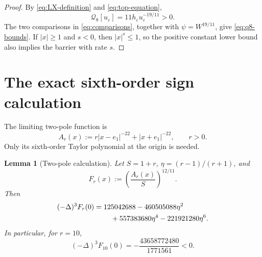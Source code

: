 \documentclass[11pt,reqno]{amsart}
\newtheorem{lemma}[theorem]{Lemma}
\theoremstyle{remark}
\newcommand{\Qlx}{\mathcal{Q}}
\newcommand{\eps}{\varepsilon}
\begin{document}
\begin{proof}
By \eqref{eq:LX-definition} and \eqref{eq:top-equation},
\begin{equation}\label{eq:q8-explicit}
 \Qlx_8[u_\eps]
 =11h_\eps u_\eps^{-19/11}>0.
\end{equation}
The two comparisons in \eqref{eq:comparisons}, together with
\(\psi=W^{19/11}\), give \eqref{eq:q8-bounds}.  If \(|x|\geq1\) and
\(s<0\), then \(|x|^s\leq1\), so the positive constant lower bound also
implies the barrier with rate \(s\).
\end{proof}

\section{The exact sixth-order sign calculation}

The limiting two-pole function is
\begin{equation}\label{eq:A-r}
 A_r(x):=r|x-e_1|^{-22}+|x+e_1|^{-22},
 \qquad r>0.
\end{equation}
Only its sixth-order Taylor polynomial at the origin is needed.

\begin{lemma}[Two-pole calculation]\label{lem:two-pole}
Let \(S=1+r\), \(\eta=(r-1)/(r+1)\), and
\begin{equation}\label{eq:F-r}
 F_r(x):=\left(\frac{A_r(x)}{S}\right)^{12/11}.
\end{equation}
Then
\begin{align}
 (-\Delta)^3F_r(0)
 ={}&125042688-460505088\eta^2
 \notag\\
 &\quad+557383680\eta^4-221921280\eta^6.
 \label{eq:eta-polynomial}
\end{align}
In particular, for \(r=10\),
\begin{equation}\label{eq:negative-exact}
 (-\Delta)^3F_{10}(0)
 =-\frac{43658772480}{1771561}<0.
\end{equation}
\end{lemma}
\end{document}

